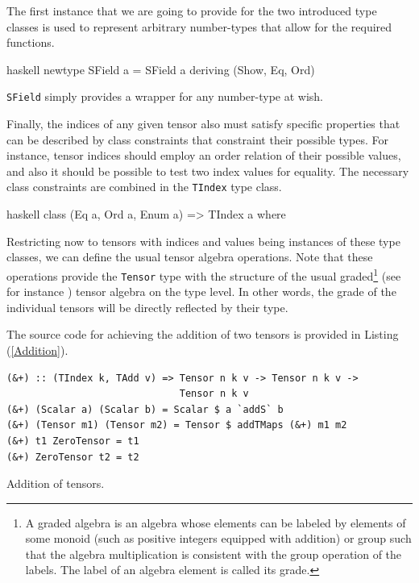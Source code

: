 \documentclass[a4paper,12pt, DIV=14, BCOR=5mm, twoside, headsepline, numbers=noenddot]{scrbook}
\begin{document}
The first instance that we are going to provide for the two introduced type classes is used to represent arbitrary number-types that allow for the required functions. 
\begin{center}
\begin{cminted}{haskell}
newtype SField a = SField a deriving (Show, Eq, Ord)
\end{cminted} 
\end{center}

\texttt{SField} simply provides a wrapper for any number-type at wish.

Finally, the indices of any given tensor also must satisfy specific properties that can be described by class constraints that constraint their possible types. For instance, tensor indices should employ an order relation of their possible values, and also it should be possible to test two index values for equality. The necessary class constraints are combined in the \texttt{TIndex} type class.

\begin{center}
\begin{cminted}{haskell}
class (Eq a, Ord a, Enum a) => TIndex a where
\end{cminted} 
\end{center}



Restricting now to tensors with indices and values being instances of these type classes, we can define the usual tensor algebra operations.
Note that these operations provide the \texttt{Tensor} type with the structure of the usual graded\footnote{A graded algebra is an algebra whose elements can be labeled by elements of some monoid (such as positive integers equipped with addition) or group such that the algebra multiplication is consistent with the group operation of the labels. The label of an algebra element is called its grade.} (see for instance \cite{bourbaki1998algebra}) tensor algebra on the type level. In other words, the grade of the individual tensors will be directly reflected by their type.

The source code for achieving the addition of two tensors is provided in Listing (\ref{Addition}).

\begin{listing}[hbt!]
\begin{verbatim}
(&+) :: (TIndex k, TAdd v) => Tensor n k v -> Tensor n k v ->
                              Tensor n k v
(&+) (Scalar a) (Scalar b) = Scalar $ a `addS` b
(&+) (Tensor m1) (Tensor m2) = Tensor $ addTMaps (&+) m1 m2
(&+) t1 ZeroTensor = t1
(&+) ZeroTensor t2 = t2
\end{verbatim} 
\caption{Addition of tensors.}\label{Addition}
\end{listing}
\end{document}
